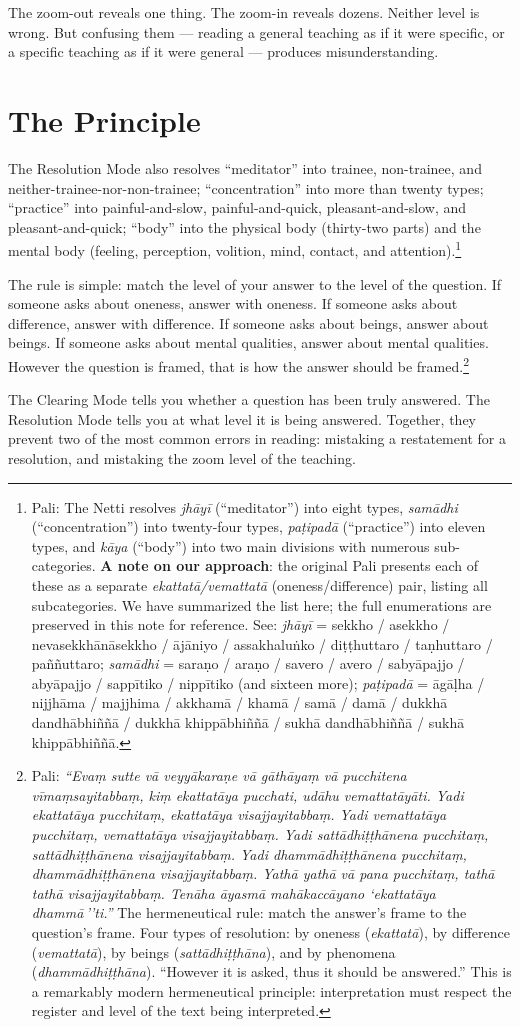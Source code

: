 The zoom-out reveals one thing. The zoom-in reveals dozens. Neither level is wrong. But confusing them --- reading a general teaching as if it were specific, or a specific teaching as if it were general --- produces misunderstanding.

\section*{The Principle}

The Resolution Mode also resolves ``meditator'' into trainee, non-trainee, and neither-trainee-nor-non-trainee; ``concentration'' into more than twenty types; ``practice'' into painful-and-slow, painful-and-quick, pleasant-and-slow, and pleasant-and-quick; ``body'' into the physical body (thirty-two parts) and the mental body (feeling, perception, volition, mind, contact, and attention).\footnote{Pali: The Netti resolves \textit{jhāyī} (``meditator'') into eight types, \textit{samādhi} (``concentration'') into twenty-four types, \textit{paṭipadā} (``practice'') into eleven types, and \textit{kāya} (``body'') into two main divisions with numerous sub-categories. \textbf{A note on our approach}: the original Pali presents each of these as a separate \textit{ekattatā/vemattatā} (oneness/difference) pair, listing all subcategories. We have summarized the list here; the full enumerations are preserved in this note for reference. See: \textit{jhāyī} = sekkho / asekkho / nevasekkhānāsekkho / ājāniyo / assakhaluṅko / diṭṭhuttaro / taṇhuttaro / paññuttaro; \textit{samādhi} = saraṇo / araṇo / savero / avero / sabyāpajjo / abyāpajjo / sappītiko / nippītiko (and sixteen more); \textit{paṭipadā} = āgāḷha / nijjhāma / majjhima / akkhamā / khamā / samā / damā / dukkhā dandhābhiññā / dukkhā khippābhiññā / sukhā dandhābhiññā / sukhā khippābhiññā.}

The rule is simple: match the level of your answer to the level of the question. If someone asks about oneness, answer with oneness. If someone asks about difference, answer with difference. If someone asks about beings, answer about beings. If someone asks about mental qualities, answer about mental qualities. However the question is framed, that is how the answer should be framed.\footnote{Pali: \textit{``Evaṃ sutte vā veyyākaraṇe vā gāthāyaṃ vā pucchitena vīmaṃsayitabbaṃ, kiṃ ekattatāya pucchati, udāhu vemattatāyāti. Yadi ekattatāya pucchitaṃ, ekattatāya visajjayitabbaṃ. Yadi vemattatāya pucchitaṃ, vemattatāya visajjayitabbaṃ. Yadi sattādhiṭṭhānena pucchitaṃ, sattādhiṭṭhānena visajjayitabbaṃ. Yadi dhammādhiṭṭhānena pucchitaṃ, dhammādhiṭṭhānena visajjayitabbaṃ. Yathā yathā vā pana pucchitaṃ, tathā tathā visajjayitabbaṃ. Tenāha āyasmā mahākaccāyano `ekattatāya dhammā\,''ti.''} The hermeneutical rule: match the answer's frame to the question's frame. Four types of resolution: by oneness (\textit{ekattatā}), by difference (\textit{vemattatā}), by beings (\textit{sattādhiṭṭhāna}), and by phenomena (\textit{dhammādhiṭṭhāna}). ``However it is asked, thus it should be answered.'' This is a remarkably modern hermeneutical principle: interpretation must respect the register and level of the text being interpreted.}

The Clearing Mode tells you whether a question has been truly answered. The Resolution Mode tells you at what level it is being answered. Together, they prevent two of the most common errors in reading: mistaking a restatement for a resolution, and mistaking the zoom level of the teaching.
